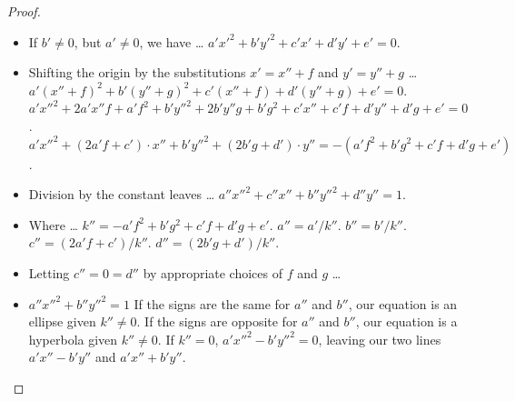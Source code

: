 \documentclass[12pt]{article}
\newcommand{\ds}{\displaystyle}
\theoremstyle{plain}
\begin{document}
\begin{proof}
  \ \\

  \begin{itemize}
    \item If $ b' \neq 0 $, but $ a' \neq 0 $, we have \dots
    \subitem $ \ds a'x'^{2} + b'y'^{2} + c'x' + d'y' + e' = 0 $.
    \item Shifting the origin by the substitutions $ x' = x'' + f $ and $ y' = y'' + g $ \dots
    \subitem $ \ds a'(x'' + f)^{2} + b'(y'' + g)^{2} + c'(x'' + f) + d'(y'' + g) + e' = 0 $.
    \subitem $ \ds a'x''^{2} + 2a'x''f + a'f^{2} + b'y''^{2} + 2b'y''g + b'g^{2} + c'x'' + c'f + d'y'' + d'g + e' = 0 $.
    \subitem $ \ds a'x''^{2} + ( 2a'f + c' ) \cdot x'' + b'y''^{2} + ( 2b'g + d' ) \cdot y'' = - ( a'f^{2} + b'g^{2} + c'f + d'g + e' ) $.
    \item Division by the constant leaves \dots
    \subitem $ \ds a''x''^{2} + c''x'' + b''y''^{2} + d''y'' = 1 $.
    \item Where \dots
    \subitem $ \ds k'' = - a'f^{2} + b'g^{2} + c'f + d'g + e' $.
    \subitem $ \ds a'' = a' / k'' $.
    \subitem $ \ds b'' = b' / k'' $.
    \subitem $ \ds c'' = ( 2a'f + c' ) / k'' $.
    \subitem $ \ds d'' = ( 2b'g + d' ) / k'' $.
    \item Letting $ c'' = 0 = d'' $ by appropriate choices of $ f $ and $ g $ \dots
    \item[$\ast$] $ \ds a''x''^{2} + b''y''^{2} = 1 $
    \subitem If the signs are the same for $ a'' $ and $ b'' $, our equation is an ellipse given $ k'' \neq 0 $.
    \subitem If the signs are opposite for $ a'' $ and $ b'' $, our equation is a hyperbola given $ k'' \neq 0 $.
    \subitem If $ k'' = 0 $, $ \ds a'x''^{2} - b'y''^{2} = 0 $, leaving our two lines $ a'x'' - b'y'' $ and $ a'x'' + b'y'' $.
  \end{itemize}

\end{proof}

\newpage
\end{document}
